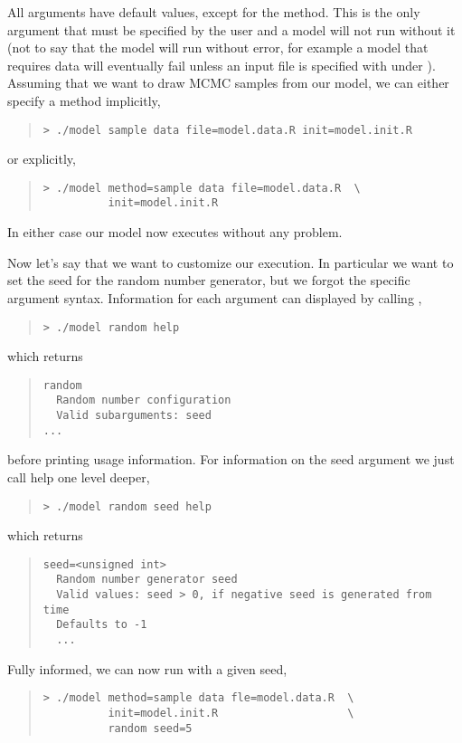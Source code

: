 All \Stan arguments have default values, except for the method.  This
is the only argument that must be specified by the user and a model
will not run without it (not to say that the model will run without error,
for example a model that requires data will eventually fail unless an input file
is specified with  under ).  Assuming that we want to draw
MCMC samples from our model, we can either specify a method
implicitly,
%
\begin{quote}
\begin{Verbatim}[fontshape=sl]
> ./model sample data file=model.data.R init=model.init.R
\end{Verbatim}
\end{quote}
%
or explicitly,
%
\begin{quote}
\begin{Verbatim}[fontshape=sl]
> ./model method=sample data file=model.data.R  \
          init=model.init.R
\end{Verbatim}
\end{quote}
%
In either case our model now executes without any problem.

Now let's say that we want to customize our execution.  In
particular we want to set the seed for the random number generator,
but we forgot the specific argument syntax.  Information for each
argument can displayed by calling \code{help},
%
\begin{quote}
\begin{Verbatim}[fontshape=sl]
> ./model random help
\end{Verbatim}
\end{quote}
%
which returns
%
\begin{quote}
\begin{Verbatim}
random
  Random number configuration
  Valid subarguments: seed
...
\end{Verbatim}
\end{quote}
%
before printing usage information.  For information on the
seed argument we just call help one level deeper,
%
\begin{quote}
\begin{Verbatim}[fontshape=sl]
> ./model random seed help
\end{Verbatim}
\end{quote}
%
which returns
%
\begin{quote}
\begin{Verbatim}
seed=<unsigned int>
  Random number generator seed
  Valid values: seed > 0, if negative seed is generated from time
  Defaults to -1
  ...
\end{Verbatim}
\end{quote}
%
Fully informed, we can now run with a given seed,
%
\begin{quote}
\begin{Verbatim}[fontshape=sl]
> ./model method=sample data fle=model.data.R  \
          init=model.init.R                    \
          random seed=5
\end{Verbatim}
\end{quote}

